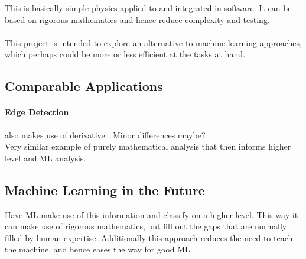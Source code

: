 \documentclass[main.tex]{subfiles}
\begin{document}
      This is basically simple physics applied to and integrated in software. It can be based on rigorous mathematics and hence reduce complexity and testing.
      \\\\
      This project is intended to explore an alternative to machine learning approaches, which perhaps could be more or less efficient at the tasks at hand. 
    
    \subsection{Comparable Applications}
    
      \paragraph{Edge Detection} also makes use of derivative \cite{}. Minor differences maybe? \\
      Very similar example of purely mathematical analysis that then informs higher level and ML analysis.
    
    \subsection{Machine Learning in the Future}
    
      Have ML make use of this information and classify on a higher level. This way it can make use of rigorous mathematics, but fill out the gaps that are normally filled by human expertise. Additionally this approach reduces the need to teach the machine, and hence eases the way for good ML \cite{}.
    
\end{document}
